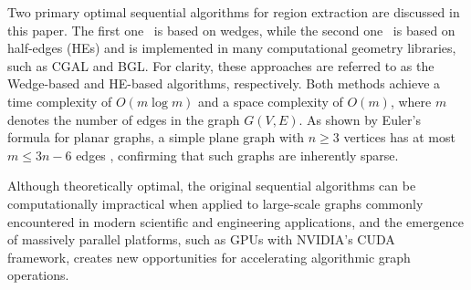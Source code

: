 \documentclass[conference]{IEEEtran}
\begin{document}

Two primary optimal sequential algorithms for region extraction are discussed in this paper. The first one~\cite{JIANG1993553} is based on wedges, while the second one~\cite{deberg2008computational} is based on half-edges (HEs) and is implemented in many computational geometry libraries, such as CGAL and BGL. For clarity, these approaches are referred to as the Wedge-based and HE-based algorithms, respectively. Both methods achieve a time complexity of $O(m \log m)$ and a space complexity of $O(m)$, where $m$ denotes the number of edges in the graph $G(V, E)$. As shown by Euler's formula for planar graphs, a simple plane graph with $n \geq 3$ vertices has at most $m \leq 3n - 6$ edges \cite{Diestel2025}, confirming that such graphs are inherently sparse.

Although theoretically optimal, the original sequential algorithms can be computationally impractical when applied to large-scale graphs commonly encountered in modern scientific and engineering applications, and the emergence of massively parallel platforms, such as GPUs with NVIDIA's CUDA~\cite{10.1145/1401132.1401152} framework, creates new opportunities for accelerating algorithmic graph operations.

\end{document}
